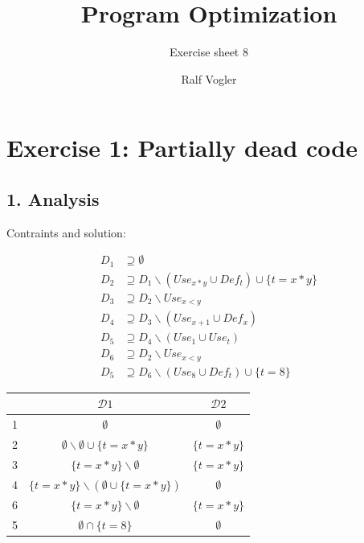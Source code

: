 \documentclass[11pt,a4paper]{scrartcl}
\begin{document}
\author{Ralf Vogler}
\title{Program Optimization}
\subtitle{Exercise sheet 8}

\maketitle

\section*{Exercise 1: Partially dead code}
\subsection*{1. Analysis}
Contraints and solution:\\
\begin{minipage}[T]{0.5\textwidth}
\begin{align*}
D_1 &\supseteq \emptyset \\
D_2 &\supseteq D_1 \backslash (Use_{x*y} \cup Def_t) \cup \{t = x*y\} \\
D_3 &\supseteq D_2 \backslash Use_{x<y} \\
D_4 &\supseteq D_3 \backslash (Use_{x+1} \cup Def_x) \\
D_5 &\supseteq D_4 \backslash (Use_1 \cup Use_t) \\
D_6 &\supseteq D_2 \backslash Use_{x<y} \\
D_5 &\supseteq D_6 \backslash (Use_8 \cup Def_t) \cup \{t = 8\}
\end{align*}
\end{minipage}
\begin{minipage}[t]{0.5\textwidth}
\begin{tabular}{|c|c|c|}
\hline
& $\mathcal{D} 1$ & $\mathcal{D} 2$\\
\hline
1 & $\emptyset$ & $\emptyset$ \\
2 & $\emptyset \backslash \emptyset \cup \{t = x*y\}$ & $\{t = x*y\}$ \\
3 & $\{t = x*y\} \backslash \emptyset$ & $\{t = x*y\}$ \\
4 & $\{t = x*y\} \backslash (\emptyset \cup \{t = x*y\})$ & $\emptyset$ \\
6 & $\{t = x*y\} \backslash \emptyset$ & $\{t = x*y\}$ \\
5 & $\emptyset \cap \{t = 8\}$ & $\emptyset$ \\
\hline
\end{tabular}
\end{minipage}
\\ \\
\end{document}
